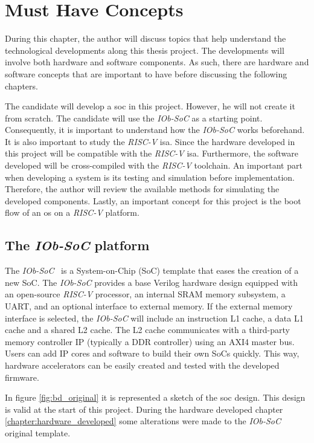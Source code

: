 \chapter{Must Have Concepts}
\label{chapter:must_have_concepts}
During this chapter, the author will discuss topics that help understand the technological developments along this thesis project. The developments will involve both hardware and software components. As such, there are hardware and software concepts that are important to have before discussing the following chapters.

The candidate will develop a \acrshort{soc} in this project. However, he will not create it from scratch. The candidate will use the \textit{IOb-SoC} as a starting point. Consequently, it is important to understand how the \textit{IOb-SoC} works beforehand. It is also important to study the \textit{RISC-V} \acrfull{isa}. Since the hardware developed in this project will be compatible with the \textit{RISC-V} \acrshort{isa}. Furthermore, the software developed will be cross-compiled with the \textit{RISC-V} toolchain. An important part when developing a system is its testing and simulation before implementation. Therefore, the author will review the available methods for simulating the developed components. Lastly, an important concept for this project is the boot flow of an \acrfull{os} on a \textit{RISC-V} platform.

\section{The \textit{IOb-SoC} platform}
\label{section:the_iob_soc_template}
The \textit{IOb-SoC}~\cite{iob_soc_repo} is a System-on-Chip (SoC) template that eases the creation of a new SoC. The \textit{IOb-SoC} provides a base Verilog hardware design equipped with an open-source \textit{RISC-V} processor, an internal SRAM memory subsystem, a UART, and an optional interface to external memory. If the external memory interface is selected, the \textit{IOb-SoC} will include an instruction L1 cache, a data L1 cache and a shared L2 cache. The L2 cache communicates with a third-party memory controller IP (typically a DDR controller) using an AXI4 master bus. Users can add IP cores and software to build their own SoCs quickly. This way, hardware accelerators can be easily created and tested with the developed firmware.

In figure \ref{fig:bd_original} it is represented a sketch of the \acrshort{soc} design. This design is valid at the start of this project. During the hardware developed chapter \ref{chapter:hardware_developed} some alterations were made to the \textit{IOb-SoC} original template.

